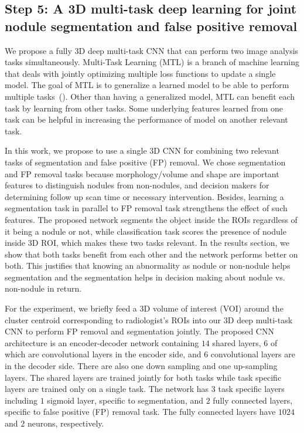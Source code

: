 \documentclass[preprint,12pt]{elsarticle}
\begin{document}
\subsection{Step 5: A 3D multi-task deep learning for joint nodule segmentation and false positive removal}
We propose a fully 3D deep multi-task CNN that can perform two image analysis tasks simultaneously. Multi-Task Learning (MTL) is a branch of machine learning that deals with jointly optimizing multiple loss functions to update a single model. The goal of MTL is to generalize a learned model to be able to perform multiple tasks~(\cite{caruana1998multitask}). Other than having a generalized model, MTL can benefit each task by learning from other tasks. Some underlying features learned from one task can be helpful in increasing the performance of model on another relevant task.

In this work, we propose to use a single 3D CNN for combining two relevant tasks of segmentation and false positive (FP) removal. We chose segmentation and FP removal tasks because morphology/volume and shape are important features to distinguish nodules from non-nodules, and decision makers for determining follow up scan time or necessary intervention. Besides, learning a segmentation task in parallel to FP removal task strengthens the effect of such features. The proposed network segments the object inside the ROIs regardless of it being a nodule or not, while classification task scores the presence of nodule inside 3D ROI, which makes these two tasks relevant. In the results section, we show that both tasks benefit from each other and the network performs better on both. This justifies that knowing an abnormality as nodule or non-nodule helps segmentation and the segmentation helps in decision making about nodule vs. non-nodule in return.

For the experiment, we briefly feed a 3D volume of interest (VOI) around the cluster centroid corresponding to radiologist’s ROIs into our 3D deep multi-task CNN to perform FP removal and segmentation jointly. The proposed CNN architecture is an encoder-decoder network containing $14$ shared layers, $6$ of which are convolutional layers in the encoder side, and $6$ convolutional layers are in the decoder side. There are also one down sampling and one up-sampling layers. The shared layers are trained jointly for both tasks while task specific layers are trained only on a single task. The network has $3$ task specific layers including $1$ sigmoid layer, specific to segmentation, and $2$ fully connected layers, specific to false positive (FP) removal task. The fully connected layers have $1024$ and $2$ neurons, respectively.
\end{document}
